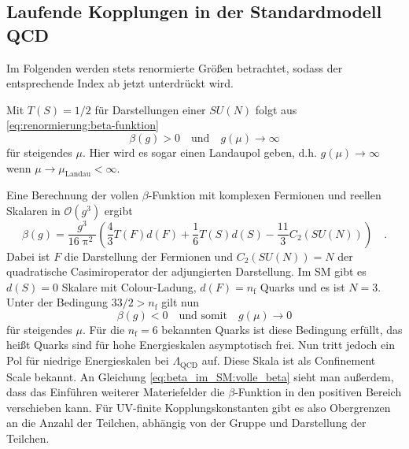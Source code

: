 \subsection{Laufende Kopplungen in der Standardmodell QCD}\label{beta_im_SM}
	Im Folgenden werden stets renormierte Größen betrachtet, sodass der 
	entsprechende Index ab jetzt unterdrückt wird.
	
	Mit $T(S)=1/2$ für Darstellungen einer $SU(N)$ folgt aus 
   \eqref{eq:renormierung:beta-funktion} 
   \begin{equation}
	\beta(g)>0 \quad \text{und} \quad    
   g(\mu) \longrightarrow \infty
   \label{eq:beta_im_SM:landau_pol}
   \end{equation}
   für steigendes $\mu$. Hier wird es sogar einen Landaupol geben, d.h. 
   $g(\mu)\to \infty$ wenn $\mu\to \mu_\text{Landau}<\infty$.  
   
   Eine Berechnung der vollen $\beta$-Funktion mit komplexen Fermionen und 
   reellen Skalaren in 
   $\mathcal{O}(g^3)$ ergibt 
   \cite{Luo_Wang_Xiao} 
   \begin{equation}
   \beta(g)=\frac{g^3}{16\uppi^2} \left( \frac{4}{3} T(F)d(F) +
   \frac{1}{6} T(S) d(S) - \frac{11}{3} C_2(SU(N)) \right)\quad .
   \label{eq:beta_im_SM:volle_beta}
   \end{equation}
   Dabei ist $F$ die Darstellung der Fermionen und $C_2(SU(N))=N$ der 
   quadratische Casimiroperator der adjungierten Darstellung. Im SM 
   gibt es $d(S)=0$ Skalare mit Colour-Ladung, $d(F)=n_\text{f}$ Quarks und 
   es ist $N=3$. Unter der Bedingung $33/2  >  n_\text{f}$ gilt nun 
	\begin{equation}
	\beta(g)<0 \quad \text{und somit} \quad g(\mu) \longrightarrow 0
	\end{equation}	   
	für steigendes $\mu$. Für die $n_\text{f}=6$ bekannten Quarks ist diese 
	Bedingung erfüllt, das heißt Quarks sind für hohe Energieskalen 
	asymptotisch frei. 
	Nun tritt jedoch ein Pol für niedrige Energieskalen bei $\Lambda_\text{QCD}$ 
	auf. Diese Skala ist als Confinement Scale bekannt.	
	An Gleichung \eqref{eq:beta_im_SM:volle_beta} 
	sieht man außerdem, dass das Einführen weiterer Materiefelder 
	die $\beta$-Funktion in den positiven Bereich verschieben kann. Für 
	UV-finite Kopplungskonstanten gibt es also Obergrenzen an die Anzahl der 
	Teilchen, abhängig von der Gruppe und Darstellung der Teilchen.
	
   
   
